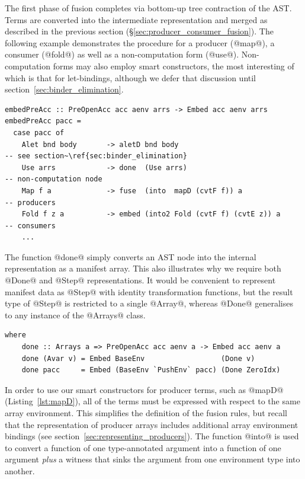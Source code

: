The first phase of fusion completes via bottom-up tree contraction of the
AST. Terms are converted into the intermediate
representation and merged as described in the previous section
(\S\ref{sec:producer_consumer_fusion}). The following example demonstrates the
procedure for a producer (@map@), a consumer (@fold@) as well as a
non-computation form (@use@). Non-computation forms may also employ smart
constructors, the most interesting of which is that for let-bindings, although
we defer that discussion until section~\ref{sec:binder_elimination}.
%
\begin{lstlisting}[style=haskell
    ,name=embedPreAcc
    ,label=lst:embedPreAcc
    ,caption={[Producer fusion via bottom-up contraction of the AST]}]
embedPreAcc :: PreOpenAcc acc aenv arrs -> Embed acc aenv arrs
embedPreAcc pacc =
  case pacc of
    Alet bnd body       -> aletD bnd body                               -- see section~\ref{sec:binder_elimination}
    Use arrs            -> done  (Use arrs)                             -- non-computation node
    Map f a             -> fuse  (into  mapD (cvtF f)) a                -- producers
    Fold f z a          -> embed (into2 Fold (cvtF f) (cvtE z)) a       -- consumers
    ...
\end{lstlisting}

The function @done@ simply converts an AST node into the internal
representation as a manifest array. This also illustrates why we require both
@Done@ and @Step@ representations. It would be convenient to represent
manifest data as @Step@ with identity transformation functions, but the
result type of @Step@ is restricted to a single @Array@, whereas
@Done@ generalises to any instance of the @Arrays@ class.

\begin{lstlisting}[style=haskell,name=embedPreAcc]
  where
    done :: Arrays a => PreOpenAcc acc aenv a -> Embed acc aenv a
    done (Avar v) = Embed BaseEnv                  (Done v)
    done pacc     = Embed (BaseEnv `PushEnv` pacc) (Done ZeroIdx)
\end{lstlisting}

In order to use our smart constructors for producer terms, such as @mapD@
(Listing~\ref{lst:mapD}), all of the terms must be expressed with respect to the
same array environment. This simplifies the definition of the fusion rules, but
recall that the representation of producer arrays includes additional array
environment bindings (see section~\ref{sec:representing_producers}). The
function @into@ is used to convert a function of one type-annotated
argument into a function of one argument \emph{plus} a witness that sinks the
argument from one environment type into another.

